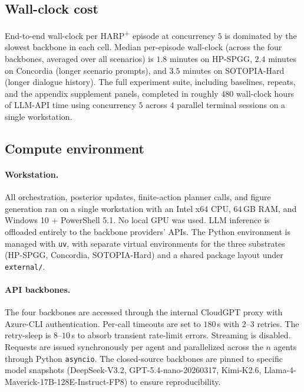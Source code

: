 \subsection{Wall-clock cost}
\label{app:cost-wallclock}

End-to-end wall-clock per HARP\textsuperscript{+} episode at concurrency $5$ is dominated by the slowest backbone in each cell. Median per-episode wall-clock (across the four backbones, averaged over all scenarios) is $1.8$ minutes on HP-SPGG, $2.4$ minutes on Concordia (longer scenario prompts), and $3.5$ minutes on SOTOPIA-Hard (longer dialogue history). The full experiment suite, including baselines, repeats, and the appendix supplement panels, completed in roughly $480$ wall-clock hours of LLM-API time using concurrency $5$ across $4$ parallel terminal sessions on a single workstation.

\subsection{Compute environment}
\label{app:cost-hardware}

\paragraph{Workstation.} All orchestration, posterior updates, finite-action planner calls, and figure generation ran on a single workstation with an Intel x64 CPU, 64\,GB RAM, and Windows 10 + PowerShell 5.1. No local GPU was used. LLM inference is offloaded entirely to the backbone providers' APIs. The Python environment is managed with \texttt{uv}, with separate virtual environments for the three substrates (HP-SPGG, Concordia, SOTOPIA-Hard) and a shared package layout under \texttt{external/}.

\paragraph{API backbones.} The four backbones are accessed through the internal CloudGPT proxy with Azure-CLI authentication. Per-call timeouts are set to $180$\,s with $2$--$3$ retries. The retry-sleep is $8$--$10$\,s to absorb transient rate-limit errors. Streaming is disabled. Requests are issued synchronously per agent and parallelized across the $n$ agents through Python \texttt{asyncio}. The closed-source backbones are pinned to specific model snapshots (DeepSeek-V3.2, GPT-5.4-nano-20260317, Kimi-K2.6, Llama-4-Maverick-17B-128E-Instruct-FP8) to ensure reproducibility.

